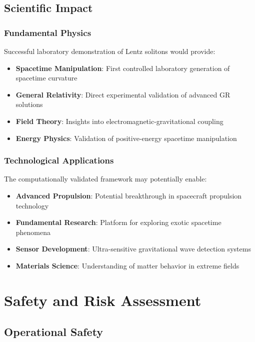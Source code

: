 \documentclass[10pt,twocolumn]{article}
\begin{document}
\subsection{Scientific Impact}

\subsubsection{Fundamental Physics}
Successful laboratory demonstration of Lentz solitons would provide:
\begin{itemize}
\item \textbf{Spacetime Manipulation}: First controlled laboratory generation of spacetime curvature
\item \textbf{General Relativity}: Direct experimental validation of advanced GR solutions
\item \textbf{Field Theory}: Insights into electromagnetic-gravitational coupling
\item \textbf{Energy Physics}: Validation of positive-energy spacetime manipulation
\end{itemize}

\subsubsection{Technological Applications}
The computationally validated framework may potentially enable:
\begin{itemize}
\item \textbf{Advanced Propulsion}: Potential breakthrough in spacecraft propulsion technology
\item \textbf{Fundamental Research}: Platform for exploring exotic spacetime phenomena
\item \textbf{Sensor Development}: Ultra-sensitive gravitational wave detection systems
\item \textbf{Materials Science}: Understanding of matter behavior in extreme fields
\end{itemize}

\section{Safety and Risk Assessment}

\subsection{Operational Safety}
\end{document}
